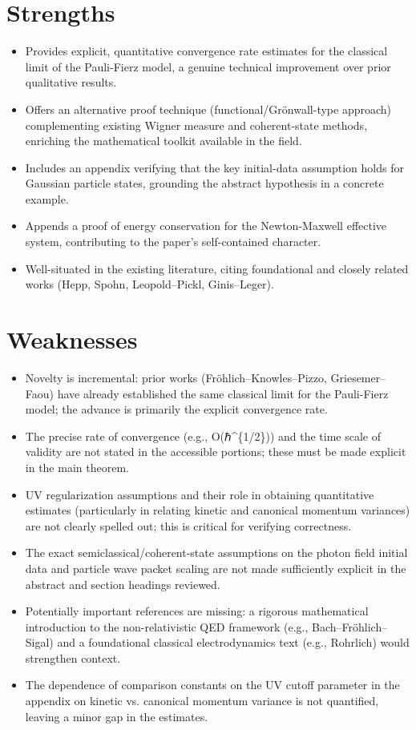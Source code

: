 \documentclass[11pt]{article}
\begin{document}
\section*{Strengths}
\begin{itemize}[leftmargin=*]
  \item Provides explicit, quantitative convergence rate estimates for the classical limit of the Pauli-Fierz model, a genuine technical improvement over prior qualitative results.
  \item Offers an alternative proof technique (functional/Grönwall-type approach) complementing existing Wigner measure and coherent-state methods, enriching the mathematical toolkit available in the field.
  \item Includes an appendix verifying that the key initial-data assumption holds for Gaussian particle states, grounding the abstract hypothesis in a concrete example.
  \item Appends a proof of energy conservation for the Newton-Maxwell effective system, contributing to the paper's self-contained character.
  \item Well-situated in the existing literature, citing foundational and closely related works (Hepp, Spohn, Leopold–Pickl, Ginis–Leger).
\end{itemize}

\section*{Weaknesses}
\begin{itemize}[leftmargin=*]
  \item Novelty is incremental: prior works (Fröhlich–Knowles–Pizzo, Griesemer–Faou) have already established the same classical limit for the Pauli-Fierz model; the advance is primarily the explicit convergence rate.
  \item The precise rate of convergence (e.g., O(ℏ\^{}\{1/2\})) and the time scale of validity are not stated in the accessible portions; these must be made explicit in the main theorem.
  \item UV regularization assumptions and their role in obtaining quantitative estimates (particularly in relating kinetic and canonical momentum variances) are not clearly spelled out; this is critical for verifying correctness.
  \item The exact semiclassical/coherent-state assumptions on the photon field initial data and particle wave packet scaling are not made sufficiently explicit in the abstract and section headings reviewed.
  \item Potentially important references are missing: a rigorous mathematical introduction to the non-relativistic QED framework (e.g., Bach–Fröhlich–Sigal) and a foundational classical electrodynamics text (e.g., Rohrlich) would strengthen context.
  \item The dependence of comparison constants on the UV cutoff parameter in the appendix on kinetic vs. canonical momentum variance is not quantified, leaving a minor gap in the estimates.
\end{itemize}
\end{document}
